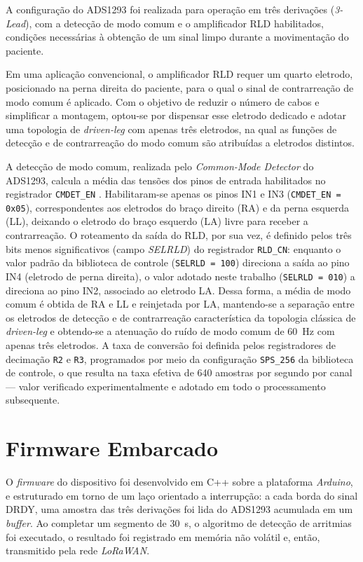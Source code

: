 A configuração do ADS1293 foi realizada para operação em três derivações (\textit{3-Lead}), com a detecção de modo comum e o amplificador RLD habilitados, condições necessárias à obtenção de um sinal limpo durante a movimentação do paciente.

Em uma aplicação convencional, o amplificador RLD requer um quarto eletrodo, posicionado na perna direita do paciente, para o qual o sinal de contrarreação de modo comum é aplicado. Com o objetivo de reduzir o número de cabos e simplificar a montagem, optou-se por dispensar esse eletrodo dedicado e adotar uma topologia de \textit{driven-leg} com apenas três eletrodos, na qual as funções de detecção e de contrarreação do modo comum são atribuídas a eletrodos distintos.

A detecção de modo comum, realizada pelo \textit{Common-Mode Detector} do ADS1293, calcula a média das tensões dos pinos de entrada habilitados no registrador \texttt{CMDET\_EN} \citep{TexasInstruments_ADS1293}. Habilitaram-se apenas os pinos IN1 e IN3 (\texttt{CMDET\_EN = 0x05}), correspondentes aos eletrodos do braço direito (RA) e da perna esquerda (LL), deixando o eletrodo do braço esquerdo (LA) livre para receber a contrarreação. O roteamento da saída do RLD, por sua vez, é definido pelos três bits menos significativos (campo \textit{SELRLD}) do registrador \texttt{RLD\_CN}: enquanto o valor padrão da biblioteca de controle (\texttt{SELRLD = 100}) direciona a saída ao pino IN4 (eletrodo de perna direita), o valor adotado neste trabalho (\texttt{SELRLD = 010}) a direciona ao pino IN2, associado ao eletrodo LA. Dessa forma, a média de modo comum é obtida de RA e LL e reinjetada por LA, mantendo-se a separação entre os eletrodos de detecção e de contrarreação característica da topologia clássica de \textit{driven-leg} e obtendo-se a atenuação do ruído de modo comum de 60~Hz com apenas três eletrodos. A taxa de conversão foi definida pelos registradores de decimação \texttt{R2} e \texttt{R3}, programados por meio da configuração \texttt{SPS\_256} da biblioteca de controle, o que resulta na taxa efetiva de 640 amostras por segundo por canal --- valor verificado experimentalmente e adotado em todo o processamento subsequente.


\section{Firmware Embarcado}
\label{sec:firmware}

O \textit{firmware} do dispositivo foi desenvolvido em C++ sobre a plataforma \textit{Arduino}, e estruturado em torno de um laço orientado a interrupção: a cada borda do sinal \acs{DRDY}, uma amostra das três derivações foi lida do ADS1293 acumulada em um \textit{buffer}. Ao completar um segmento de 30~s, o algoritmo de detecção de arritmias foi executado, o resultado foi registrado em memória não volátil e, então, transmitido pela rede \textit{LoRaWAN}.

